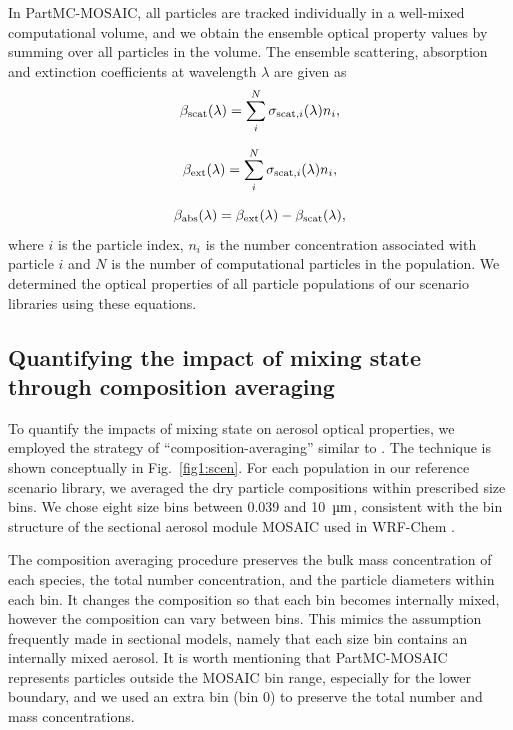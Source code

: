 \documentclass[edeposit,fullpage]{uiucthesis2009}
\makeatletter
\DeclareRobustCommand*\unit[1]
 {\ensuremath{%
   {\thinmuskip3mu\relax
    \def\mu{\text{\textmu}}\def~{\,}%
    \ifx\f@series\testbx\mathbf{#1}\else\mathrm{#1}\fi}}}
\makeatother
\begin{document}
In PartMC-MOSAIC, all particles are tracked individually in a
well-mixed computational volume, and we obtain the ensemble
optical property values by summing over all particles in the
volume. The ensemble scattering, absorption and extinction
coefficients at wavelength $\lambda$ are given as 
\begin{equation}
\label{eq:opt-cal1}
\beta_{\rm scat}(\lambda) = \sum\limits_i^{N}\sigma_{{\rm scat},i}(\lambda)n_i,
\end{equation}

\begin{equation}
\label{eq:opt-cal2}
\beta_{\rm ext}(\lambda)  = \sum\limits_i^{N}\sigma_{{\rm scat},i}(\lambda)n_i, 
\end{equation}

\begin{equation}
\label{eq:opt-cal3}
\beta_{\rm abs}(\lambda)  = \beta_{\rm ext}(\lambda) - \beta_{\rm scat}(\lambda),
\end{equation}
where $i$ is the particle index, $n_i$ is the number concentration associated with particle $i$ and $N$ is the number of computational
particles in the population. We determined the optical properties of all particle populations of our
scenario libraries using these equations. 

\subsection{Quantifying the impact of mixing state through composition averaging}
To quantify the impacts of mixing state on aerosol optical properties,
we employed the strategy of ``composition-averaging'' similar to
\citet{Ching2016}. The technique is shown conceptually in
Fig.~\ref{fig1:scen}. For each population in our reference scenario
library, we averaged the dry particle compositions within prescribed
size bins. We chose eight size bins between 0.039 and 10~\unit{\mu m},
consistent with the bin structure of the sectional aerosol module
MOSAIC used in WRF-Chem \citep{fast2006evolution}.

The composition averaging procedure preserves the bulk mass
concentration of each species, the total number concentration, and the
particle diameters within each bin. It changes the composition so that
each bin becomes internally mixed, however the composition can vary
between bins. This mimics the assumption frequently made in sectional
models, namely that each size bin contains an internally mixed
aerosol. It is worth mentioning that PartMC-MOSAIC represents
particles outside the MOSAIC bin range, especially for the lower
boundary, and we used an extra bin (bin 0) to preserve the total
number and mass concentrations.
\end{document}
